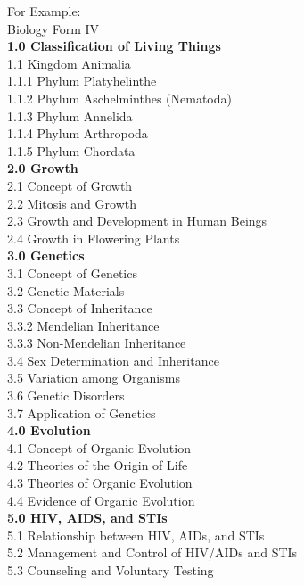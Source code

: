 \pagebreak
\begin{flushleft}
\begin{small}
For Example:\\
Biology Form IV\\
\textbf{1.0 Classification of Living Things\\}
1.1 Kingdom Animalia\\
1.1.1 Phylum Platyhelinthe\\
1.1.2 Phylum Aschelminthes (Nematoda)\\
1.1.3 Phylum Annelida\\
1.1.4 Phylum Arthropoda\\
1.1.5 Phylum Chordata\\
\textbf{2.0 Growth\\}
2.1 Concept of Growth\\
2.2 Mitosis and Growth\\
2.3 Growth and Development in Human Beings\\
2.4 Growth in Flowering Plants\\
\textbf{3.0 Genetics\\}
3.1 Concept of Genetics\\
3.2 Genetic Materials\\
3.3 Concept of Inheritance\\
3.3.2 Mendelian Inheritance\\
3.3.3 Non-Mendelian Inheritance\\
3.4 Sex Determination and Inheritance\\
3.5 Variation among Organisms\\
3.6 Genetic Disorders \\
3.7 Application of Genetics\\
\textbf{4.0 Evolution\\}
4.1 Concept of Organic Evolution\\
4.2 Theories of the Origin of Life\\
4.3 Theories of Organic Evolution\\
4.4 Evidence of Organic Evolution\\
\textbf{5.0 HIV, AIDS, and STIs\\}
5.1 Relationship between HIV, AIDs, and STIs\\
5.2 Management and Control of HIV/AIDs and STIs\\
5.3 Counseling and Voluntary Testing \\
\end{small}
\end{flushleft}

